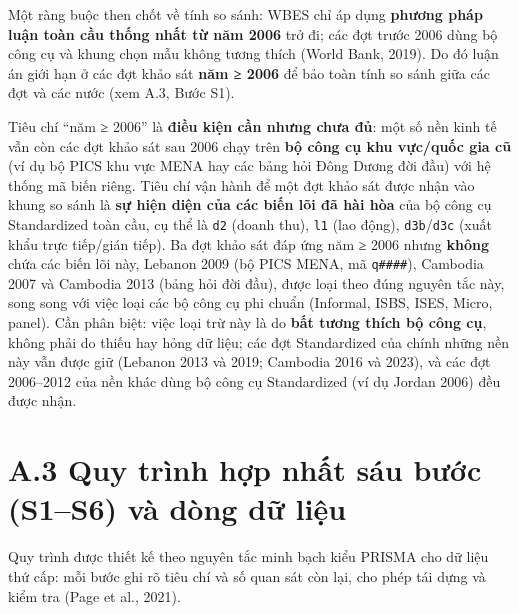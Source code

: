 \documentclass[
  a4paper,
  13pt]{extreport}
\begin{document}
Một ràng buộc then chốt về tính so sánh: WBES chỉ áp dụng \textbf{phương
pháp luận toàn cầu thống nhất từ năm 2006} trở đi; các đợt trước 2006
dùng bộ công cụ và khung chọn mẫu không tương thích (World Bank, 2019).
Do đó luận án giới hạn ở các đợt khảo sát \textbf{năm ≥ 2006} để bảo
toàn tính so sánh giữa các đợt và các nước (xem A.3, Bước S1).

Tiêu chí ``năm ≥ 2006'' là \textbf{điều kiện cần nhưng chưa đủ}: một số
nền kinh tế vẫn còn các đợt khảo sát sau 2006 chạy trên \textbf{bộ công
cụ khu vực/quốc gia cũ} (ví dụ bộ PICS khu vực MENA hay các bảng hỏi
Đông Dương đời đầu) với hệ thống mã biến riêng. Tiêu chí vận hành để một
đợt khảo sát được nhận vào khung so sánh là \textbf{sự hiện diện của các
biến lõi đã hài hòa} của bộ công cụ Standardized toàn cầu, cụ thể là
\texttt{d2} (doanh thu), \texttt{l1} (lao động),
\texttt{d3b}/\texttt{d3c} (xuất khẩu trực tiếp/gián tiếp). Ba đợt khảo
sát đáp ứng năm ≥ 2006 nhưng \textbf{không} chứa các biến lõi này,
Lebanon 2009 (bộ PICS MENA, mã \texttt{q\#\#\#\#}), Cambodia 2007 và
Cambodia 2013 (bảng hỏi đời đầu), được loại theo đúng nguyên tắc này,
song song với việc loại các bộ công cụ phi chuẩn (Informal, ISBS, ISES,
Micro, panel). Cần phân biệt: việc loại trừ này là do \textbf{bất tương
thích bộ công cụ}, không phải do thiếu hay hỏng dữ liệu; các đợt
Standardized của chính những nền này vẫn được giữ (Lebanon 2013 và 2019;
Cambodia 2016 và 2023), và các đợt 2006--2012 của nền khác dùng bộ công
cụ Standardized (ví dụ Jordan 2006) đều được nhận.

\hypertarget{a.3-quy-truxecnh-hux1ee3p-nhux1ea5t-suxe1u-bux1b0ux1edbc-s1s6-vuxe0-duxf2ng-dux1eef-liux1ec7u}{%
\section{A.3 Quy trình hợp nhất sáu bước (S1--S6) và dòng dữ
liệu}\label{a.3-quy-truxecnh-hux1ee3p-nhux1ea5t-suxe1u-bux1b0ux1edbc-s1s6-vuxe0-duxf2ng-dux1eef-liux1ec7u}}

Quy trình được thiết kế theo nguyên tắc minh bạch kiểu PRISMA cho dữ
liệu thứ cấp: mỗi bước ghi rõ tiêu chí và số quan sát còn lại, cho phép
tái dựng và kiểm tra (Page et al., 2021).
\end{document}
